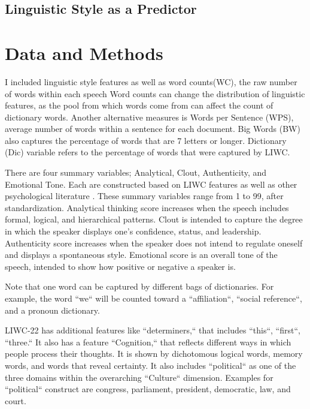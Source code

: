\documentclass[12pt]{article}
\begin{document}
\subsection{Linguistic Style as a Predictor}


\section{Data and Methods}

I included linguistic style features as well as word counts(WC), the raw number of words within each speech Word counts can change the distribution of linguistic features, as the pool from which words come from can affect the count of dictionary words. Another alternative measures is Words per Sentence (WPS), average number of words within a sentence for each document. Big Words (BW) also captures the percentage of words that are 7 letters or longer. Dictionary (Dic) variable refers to the percentage of words that were captured by LIWC.

There are four summary variables; Analytical, Clout, Authenticity, and Emotional Tone. Each are constructed based on LIWC features as well as other psychological literature \parencite{boyd_did_2015, cohn_linguistic_2004, kacewicz_pronoun_2014, newman_lying_2003}. These summary variables range from 1 to 99, after standardization. Analytical thinking score increases when the speech includes formal, logical, and hierarchical patterns. Clout is intended to capture the degree in which the speaker displays one's confidence, status, and leadership. Authenticity score increases when the speaker does not intend to regulate oneself and displays a spontaneous style. Emotional score is an overall tone of the speech, intended to show how positive or negative a speaker is.

Note that one word can be captured by different bags of dictionaries. For example, the word ``we`` will be counted toward a ``affiliation``, ``social reference``, and a pronoun dictionary.

LIWC-22 has additional features like ``determiners,`` that includes ``this``, ``first``, ``three.`` It also has a feature ``Cognition,`` that reflects different ways in which people process their thoughts. It is shown by dichotomous logical words, memory words, and words that reveal certainty. It also includes ``political`` as one of the three domains within the overarching ``Culture`` dimension. Examples for ``political`` construct are congress, parliament, president, democratic, law, and court.
\end{document}
